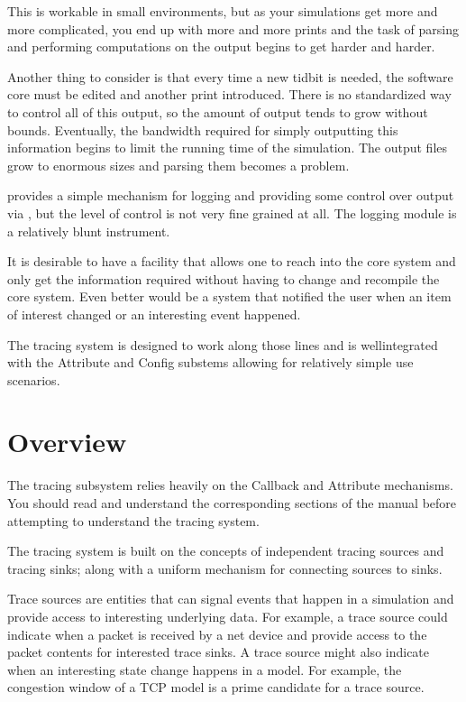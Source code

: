 \documentclass[letterpaper,10pt,english]{sphinxmanual}
\begin{document}
This is workable in small environments, but as your simulations get more and
more complicated, you end up with more and more prints and the task of parsing
and performing computations on the output begins to get harder and harder.

Another thing to consider is that every time a new tidbit is needed, the
software core must be edited and another print introduced. There is no
standardized way to control all of this output, so the amount of output tends to
grow without bounds. Eventually, the bandwidth required for simply outputting
this information begins to limit the running time of the simulation. The output
files grow to enormous sizes and parsing them becomes a problem.

 provides a simple mechanism for logging and providing some control over
output via , but the level of control is not very fine grained
at all. The logging module is a relatively blunt instrument.

It is desirable to have a facility that allows one to reach into the core system
and only get the information required without having to change and recompile the
core system. Even better would be a system that notified the user when an item
of interest changed or an interesting event happened.

The  tracing system is designed to work along those lines and is
well\sphinxhyphen{}integrated with the Attribute and Config substems allowing for relatively
simple use scenarios.


\section{Overview}
\label{\detokenize{tracing:overview}}
The tracing subsystem relies heavily on the  Callback and Attribute
mechanisms. You should read and understand the corresponding sections of the
manual before attempting to understand the tracing system.

The  tracing system is built on the concepts of independent tracing sources
and tracing sinks; along with a uniform mechanism for connecting sources to
sinks.

Trace sources are entities that can signal events that happen in a simulation
and provide access to interesting underlying data. For example, a trace source
could indicate when a packet is received by a net device and provide access to
the packet contents for interested trace sinks. A trace source might also
indicate when an interesting state change happens in a model. For example, the
congestion window of a TCP model is a prime candidate for a trace source.
\end{document}
